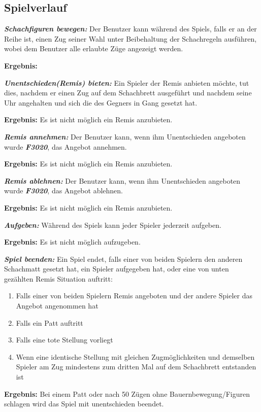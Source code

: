 \documentclass[parskip=full]{scrartcl}
\begin{document}
\subsection{Spielverlauf} 
\begin{description}
	\item[F3010]\textbf{\textit{Schachfiguren bewegen: }}Der Benutzer kann während des Spiels, falls er an der Reihe ist, einen Zug seiner Wahl unter Beibehaltung der Schachregeln ausführen, wobei dem Benutzer alle erlaubte Züge  angezeigt werden.
	\item \textbf{Ergebnis: } 
	
	\item[F3020] \textbf{\textit{Unentschieden(Remis) bieten: }} Ein Spieler der Remis anbieten möchte, tut dies, nachdem er einen Zug auf dem Schachbrett ausgeführt und nachdem seine Uhr angehalten und sich die des Gegners in Gang gesetzt hat.
	\item \textbf{Ergebnis: } Es ist nicht möglich ein Remis anzubieten.
	
	\item[F3030] \textbf{\textit{Remis annehmen: }} Der Benutzer kann, wenn ihm Unentschieden angeboten wurde \textbf{\textit{F3020}}, das Angebot annehmen.
	\item \textbf{Ergebnis: } Es ist nicht möglich ein Remis anzubieten.
	
	\item[F3040] \textbf{\textit{Remis ablehnen: }} Der Benutzer kann, wenn ihm Unentschieden angeboten wurde \textbf{\textit{F3020}}, das Angebot ablehnen.
	\item \textbf{Ergebnis: } Es ist nicht möglich ein Remis anzubieten.	
	
	\item[F3050] \textbf{\textit{Aufgeben: }} Während des Spiels kann jeder Spieler jederzeit aufgeben.
	\item \textbf{Ergebnis: } Es ist nicht möglich aufzugeben.
	
	\item[F3060] \textbf{\textit{Spiel beenden: }} Ein Spiel endet, falls einer von beiden Spielern den anderen Schachmatt gesetzt hat, ein Spieler aufgegeben hat, oder eine von unten gezählten Remis Situation auftritt:
	\begin{enumerate}	    
		\item Falls einer von beiden Spielern Remis angeboten und der andere Spieler das Angebot angenommen hat
		\item Falls ein Patt auftritt
		\item Falls eine tote Stellung vorliegt
		\item Wenn eine identische Stellung mit gleichen Zugmöglichkeiten und demselben Spieler am Zug mindestens zum dritten Mal auf dem Schachbrett entstanden ist 
	\end{enumerate}
	\item \textbf{Ergebnis: } Bei einem Patt oder nach 50 Zügen ohne Bauernbewegung/Figuren schlagen wird das Spiel mit unentschieden beendet.
	

\end{description}
\end{document}
